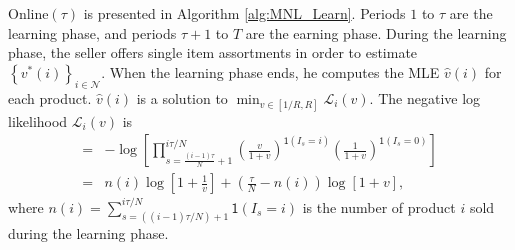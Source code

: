 \documentclass{article}
\theoremstyle{definition}
\newcommand{\NNN}{\mathcal{N}}
\newcommand{\SSS}{\mathcal{S}}
\begin{document}


{\sc Online}$(\tau)$ is presented in Algorithm \ref{alg:MNL_Learn}. Periods $1$ to $\tau$ are the learning phase, and periods $\tau + 1$ to $T$ are the earning phase. During the learning phase, the seller offers single item assortments in order to estimate $\left\{v^*(i)\right\}_{i\in \NNN}$. When the learning phase ends, he computes the MLE $\hat{v}(i)$ for each product. $\hat{v}(i)$ is a solution to $\min_{v\in [1/R, R]} \mathcal{L}_i(v)$. The negative log likelihood $\mathcal{L}_i(v)$ is  %
\begin{align}%
=& -\log\left[\prod^{i\tau/N}_{s = \frac{(i-1)\tau}{N} +1} \left(\frac{v}{1 + v}\right)^{\mathsf{1}(I_s = i)}\left(\frac{1}{1+v}\right)^{\mathsf{1}(I_s = 0)}\right] \nonumber\\
= & n(i)\log\left[1+\frac{1}{v}\right] + \left(\frac{\tau}{N} - n(i)\right)\log\left[1 + v\right],\label{eq:simple-veloglikelihood}
\end{align}
where $n(i) =  \sum^{i \tau/N}_{s = ((i-1)\tau/N) + 1}  \mathsf{1}(I_s = i)$ is the number of product $i$ sold during the learning phase.
\end{document}
